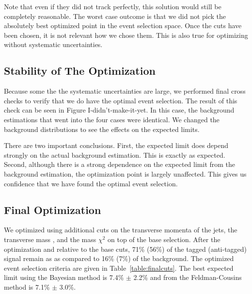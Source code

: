 Note that even if they did not track perfectly, this solution would
still be completely reasonable.  The worst case outcome is that we did
not pick the absolutely best optimized point in the event selection
space.  Once the cuts have been chosen, it is not relevant how we
chose them.  This is also true for optimizing without systematic
uncertainties.

\subsection{Stability of The Optimization}
\label{section:compBayesFC}

Because some the the systematic uncertainties are large, we performed
final cross checks to verify that we do have the optimal event
selection.  The result of this check can be seen in Figure
I-didn't-make-it-yet.  In this case, the background estimations that
went into the four cases were identical.  We changed the background
distributions to see the effects on the expected limits.

There are two important conclusions.  First, the expected limit does
depend strongly on the actual background estimation.  This is exactly
as expected.  Second, although there is a strong dependence on the
expected limit from the background estimation, the optimization point
is largely unaffected.  This gives us confidence that we have found
the optimal event selection.



\subsection{Final Optimization}
\label{section:optvariables}
We optimized using additional cuts on the transverse momenta of the
jets, the transverse mass \mt, and the mass $\chi^2$ on top of the
base selection. After the optimization and relative to the base cuts,
71\% (56\%) of the tagged (anti-tagged) signal remain as as compared
to 16\% (7\%) of the background. The optimized event selection
criteria are given in Table~\ref{table:finalcuts}.  The best expected
limit using the Bayesian method is 7.4\% $\pm$ 2.2\% and from the
Feldman-Cousins method is 7.1\% $\pm$ 3.0\%.

